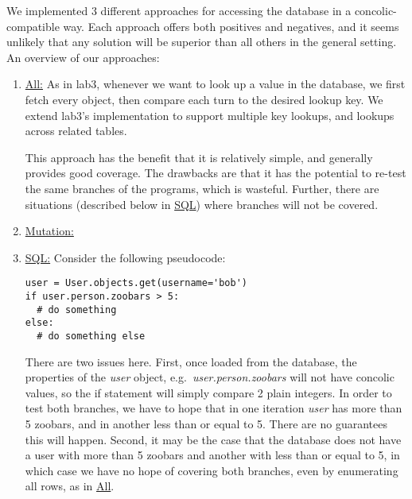 \documentclass{scrartcl}
\begin{document}
We implemented 3 different approaches for accessing the database in a
concolic-compatible way. Each approach offers both positives and negatives, and it
seems unlikely that any solution will be superior than all others in the general
setting. An overview of our approaches:

\begin{enumerate}
\item \underline{All:} As in lab3, whenever we want to look up a value
  in the database, we first fetch every object, then compare each turn to the
  desired lookup key. We extend lab3's implementation to support multiple key
  lookups, and lookups across related tables. 

  This approach has the benefit that it is relatively simple, and generally
  provides good coverage. The drawbacks are that it has the potential to re-test
  the same branches of the programs, which is wasteful. Further, there are
  situations (described below in \underline{SQL}) where branches will not be
  covered.

\item \underline{Mutation:}

\item \underline{SQL:} Consider the following pseudocode:

\begin{verbatim}
user = User.objects.get(username='bob')
if user.person.zoobars > 5:
  # do something
else:
  # do something else
\end{verbatim}

There are two issues here. First, once loaded from the database, the properties
of the \textit{user} object, e.g.\ \textit{user.person.zoobars} will not have
concolic values, so the if statement will simply compare 2
plain integers. In order to test both branches, we have to hope that
in one iteration \textit{user} has more than 5 zoobars, and in another less than
or equal to 5. There are no guarantees this will happen. Second, it may be the
case that the database does not have a user with more than 5 zoobars and another
with less than or equal to 5, in which case we have no
hope of covering both branches, even by enumerating all rows, as in
\underline{All}.


\end{enumerate}
\end{document}
